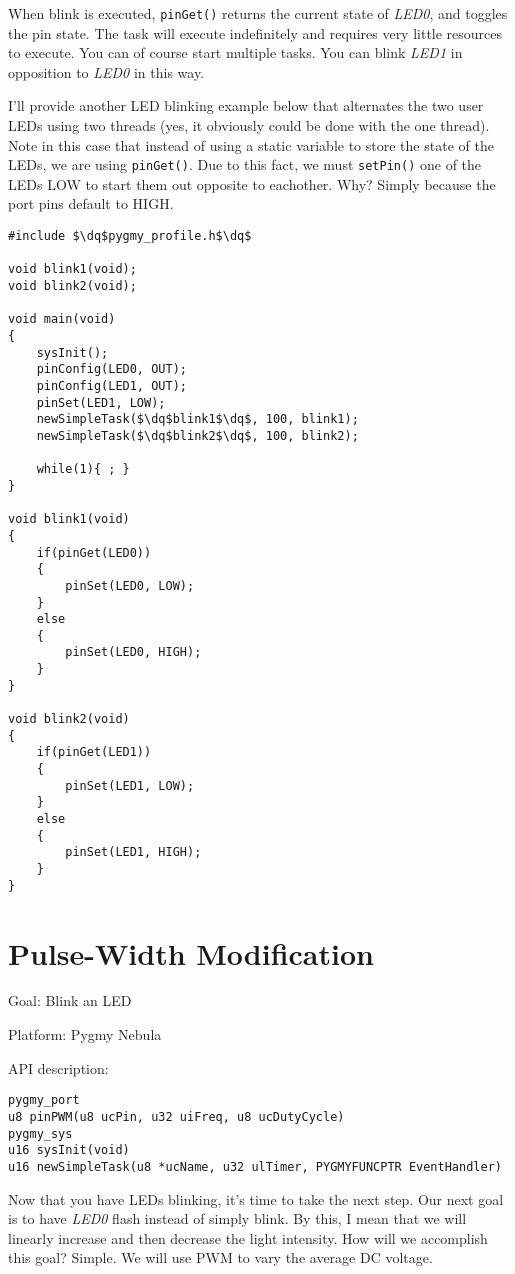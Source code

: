 \documentclass{article}
\newcommand{\dq}{\textquotedbl}
\begin{document}
When blink is executed, \verb|pinGet()| returns the current state of \emph{LED0}, and toggles the pin state. The task will execute indefinitely and requires very little resources to execute. You can of course start multiple tasks. You can blink \emph{LED1} in opposition to \emph{LED0} in this way.

I'll provide another LED blinking example below that alternates the two user LEDs using two threads (yes, it obviously could be done with the one thread). Note in this case that instead of using a static variable to store the state of the LEDs, we are using \verb|pinGet()|. Due to this fact, we must \verb|setPin()| one of the LEDs LOW to start them out opposite to eachother. Why? Simply because the port pins default to HIGH.

\begin{lstlisting}
#include $\dq$pygmy_profile.h$\dq$

void blink1(void);
void blink2(void);

void main(void)
{
	sysInit();
	pinConfig(LED0, OUT);
	pinConfig(LED1, OUT);
	pinSet(LED1, LOW);
	newSimpleTask($\dq$blink1$\dq$, 100, blink1);
	newSimpleTask($\dq$blink2$\dq$, 100, blink2);

	while(1){ ; }
}

void blink1(void)
{
	if(pinGet(LED0))
	{
		pinSet(LED0, LOW);
	}
	else
	{
		pinSet(LED0, HIGH);
	}
}

void blink2(void)
{
	if(pinGet(LED1))
	{
		pinSet(LED1, LOW);
	}
	else
	{
		pinSet(LED1, HIGH);
	}
}
\end{lstlisting}

\section{Pulse-Width Modification}

Goal: Blink an LED

Platform: Pygmy Nebula

API description:

\begin{lstlisting}
pygmy_port
u8 pinPWM(u8 ucPin, u32 uiFreq, u8 ucDutyCycle)
pygmy_sys
u16 sysInit(void)
u16 newSimpleTask(u8 *ucName, u32 ulTimer, PYGMYFUNCPTR EventHandler)
\end{lstlisting}

Now that you have LEDs blinking, it's time to take the next step. Our next goal is to have \emph{LED0} flash instead of simply blink. By this, I mean that we will linearly increase and then decrease the light intensity. How will we accomplish this goal? Simple. We will use \ac{PWM} to vary the average DC voltage.
\end{document}

